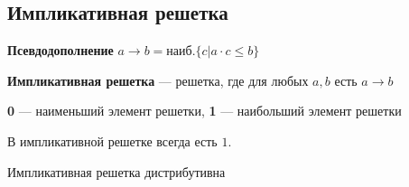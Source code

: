 \documentclass[english]{article}
\begin{document}
\subsection{Импликативная решетка}
\label{sec:orgf386636}
\begin{definition}
	\textbf{Псевдодополнение} \(a \to b = \text{наиб.}\{c \big| a \cdot c \le b\}\)
	\label{org224aedd}
\end{definition}
\begin{definition}
	\textbf{Импликативная решетка} --- решетка, где для любых \(a, b\) есть \(a \to b\)
	\label{org889260d}
\end{definition}
\begin{definition}
	\textbf{0} --- наименьший элемент решетки, \textbf{1} --- наибольший элемент решетки
	\label{orgb9c8891}
\end{definition}
\begin{lemma}
	В импликативной решетке всегда есть \(1\).
	\label{orgc4618e6}
\end{lemma}
\begin{lemma}
	Импликативная решетка дистрибутивна
\end{lemma}
\end{document}
